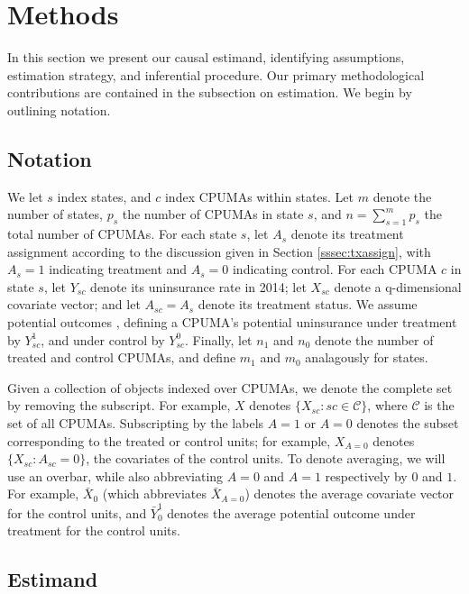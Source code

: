 \documentclass[aoas]{imsart}
\theoremstyle{plain}
\theoremstyle{remark}
\begin{document}
\section{Methods}\label{sec:methods}

In this section we present our causal estimand, identifying assumptions, estimation strategy, and inferential procedure. Our primary methodological contributions are contained in the subsection on estimation. We begin by outlining notation.

\subsection{Notation}
We let $s$ index states, and $c$ index CPUMAs within states. Let $m$ denote the number of states, $p_s$  the number of CPUMAs in state $s$, and $n = \sum_{s=1}^m p_s$ the total number of CPUMAs. For each state $s$, let $A_s$ denote its treatment assignment according to the discussion given in Section \ref{sssec:txassign}, with $A_s = 1$ indicating treatment and $A_s=0$ indicating control. For each CPUMA $c$ in state $s$, let $Y_{sc}$ denote its uninsurance rate in 2014; let $X_{sc}$ denote a q-dimensional covariate vector; and let $A_{sc} = A_{s}$ denote its treatment status. We assume potential outcomes \citep{rubin2005causal}, defining a CPUMA's potential uninsurance under treatment by $Y^1_{sc}$, and under control by $Y^0_{sc}$. Finally, let $n_1$ and $n_0$ denote the number of treated and control CPUMAs, and define $m_1$ and $m_0$ analagously for states.

Given a collection of objects indexed over CPUMAs, we denote the complete set by removing the subscript. For example, $X$ denotes $\{X_{sc}: sc \in \mathcal{C}\}$, where $\mathcal{C}$ is the set of all CPUMAs. Subscripting by the labels $A=1$ or $A=0$ denotes the subset corresponding to the treated or control units; for example, $X_{A=0}$ denotes $\{X_{sc}: A_{sc}=0\}$, the covariates of the control units. To denote averaging, we will use an overbar, while also abbreviating $A=0$ and $A=1$ respectively by $0$ and $1$. For example, $\bar{X}_0$ (which abbreviates $\bar{X}_{A=0}$) denotes the average covariate vector for the control units, and $\bar{Y}_0^1$ denotes the average potential outcome under treatment for the control units.

\subsection{Estimand} \label{ssec:estimand}
\end{document}
